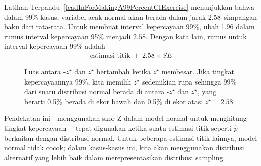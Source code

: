 Latihan Terpandu~\ref{leadInForMakingA99PercentCIExercise} menunjukkan
bahwa dalam 99\% kasus, variabel acak normal akan berada dalam jarak
2.58~simpangan baku dari rata-rata.
Untuk membuat interval kepercayaan 99\%, ubah 1.96 dalam rumus
interval kepercayaan 95\% menjadi $2.58$.
Dengan kata lain, rumus
untuk interval kepercayaan 99\% adalah
\begin{align*}
\text{estimasi titik}\ \pm\ 2.58 \times SE
\end{align*}

\begin{figure}[h]
  \centering
  \caption{Luas antara -$z^{\star}$ dan $z^{\star}$ bertambah ketika
      $z^{\star}$ membesar. Jika tingkat kepercayaannya 99\%,
      kita memilih $z^{\star}$ sedemikian rupa sehingga 99\% dari suatu distribusi
      normal berada di antara -$z^{\star}$ dan $z^{\star}$,
      yang berarti 0.5\% berada
      di ekor bawah dan 0.5\% di ekor atas:
      $z^{\star}=2.58$.}
\label{choosingZForCI}
\end{figure}


Pendekatan ini---menggunakan skor-Z dalam
model normal untuk menghitung tingkat kepercayaan---
tepat digunakan ketika suatu estimasi titik seperti $\hat{p}$
berkaitan dengan distribusi normal.
Untuk beberapa estimasi titik lainnya, model normal tidak cocok;
dalam kasus-kasus ini, kita akan menggunakan distribusi alternatif yang lebih baik
dalam merepresentasikan distribusi sampling.

